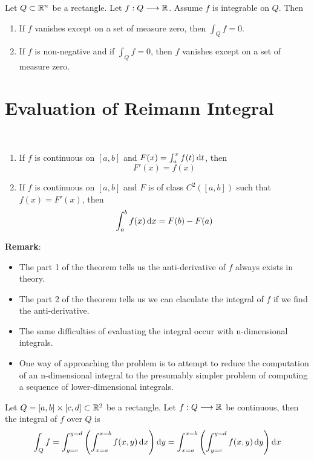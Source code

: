 \begin{theorem}
    Let $Q\subset \mathbb{R}^n$ be a rectangle. Let $f:Q\longrightarrow \mathbb{R}$. Assume $f$ is integrable on $Q$. Then
    \begin{enumerate}
        \item If $f$ vanishes except on a set of measure zero, then $\int_Qf=0$.
        \item If $f$ is non-negative and if $\int_Qf=0$, then $f$ vanishes except on a set of measure zero.
    \end{enumerate}
\end{theorem}

\section{Evaluation of Reimann Integral}

\begin{theorem}\label{FTC}\
    \begin{enumerate}
        \item If $f$ is continuous on $[a,b]$ and $F(x)=\int_a^xf(t)\operatorname{d\!} t$, then $$F'(x)=f(x)$$
        \item If $f$ is continuous on $[a,b]$ and $F$ is of class $C^2([a,b])$ such that $f(x)=F'(x)$, then $$\int_a^bf(x)\operatorname{d\!} x=F(b)-F(a)$$
    \end{enumerate}
\end{theorem}
\noindent \textbf{Remark}:
\begin{itemize}
    \item The part 1 of the theorem tells us the anti-derivative of $f$ always exists in theory.
    \item The part 2 of the theorem tells us we can claculate the integral of $f$ if we find the anti-derivative.
    \item The same difficulties of evaluating the integral occur with n-dimensional integrals.
    \item One way of approaching the problem is to attempt to reduce the computation of an n-dimensional integral to the presumably simpler problem of computing a sequence of lower-dimensional integrals.
\end{itemize}

\begin{theorem} \label{Fubini for continuous functions of two variable}
    Let $Q = [a, b] \times[c,d]\subset \mathbb{R}^2$ be a rectangle. Let $f:Q\longrightarrow \mathbb{R}$ be continuous, then the integral of $f$ over $Q$ is
    $$\int_Qf=\int_{y=c}^{y=d}\left(\int_{x=a}^{x=b}f(x,y)\operatorname{d\!} x\right)\operatorname{d\!} y=\int_{x=a}^{x=b}\left(\int_{y=c}^{y=d}f(x,y)\operatorname{d\!} y\right)\operatorname{d\!} x$$
\end{theorem}

